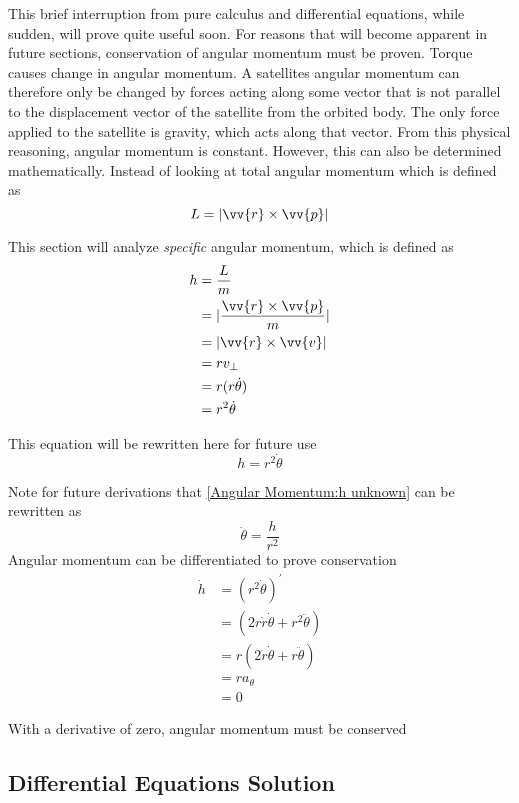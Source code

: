 \documentclass[../basicOrbitalDynamics.tex]{subfiles}
\begin{document}
This brief interruption from pure calculus and differential equations, while sudden, will prove quite useful soon. For reasons that will become apparent in future sections, conservation of angular momentum must be proven. Torque causes change in angular momentum. A satellites angular momentum can therefore only be changed by forces acting along some vector that is not parallel to the displacement vector of the satellite from the orbited body. The only force applied to the satellite is gravity, which acts along that vector. From this physical reasoning, angular momentum is constant. However, this can also be determined mathematically. Instead of looking at total angular momentum which is defined as
$$L=|\vv{r}\times\vv{p}|$$

This section will analyze \textit{specific} angular momentum, which is defined as
\begin{align*}
    h & =\frac{L}{m}                    \\
      & =|\frac{\vv{r}\times\vv{p}}{m}| \\
      & =|\vv{r}\times\vv{v}|           \\
      & =rv_\perp{}                     \\
      & =r(r\dot{\theta})               \\
      & =r^2\dot{\theta}
\end{align*}

This equation will be rewritten here for future use
\begin{equation}\label{Angular Momentum:h unknown}
    h=r^2\dot{\theta}
\end{equation}

Note for future derivations that \eqref{Angular Momentum:h unknown} can be rewritten as
$$\dot{\theta}=\frac{h}{r^2}$$
Angular momentum can be differentiated to prove conservation
\begin{align*}
    \dot{h} & =(r^2\dot{\theta})^\prime                 \\
            & =(2r\dot{r}\dot{\theta}+r^2\ddot{\theta}) \\
            & =r(2\dot{r}\dot{\theta}+r\ddot{\theta})   \\
            & =ra_\theta                                \\
            & =0
\end{align*}

With a derivative of zero, angular momentum must be conserved

\bigskip\bigskip
\subsection{Differential Equations Solution}
\end{document}
